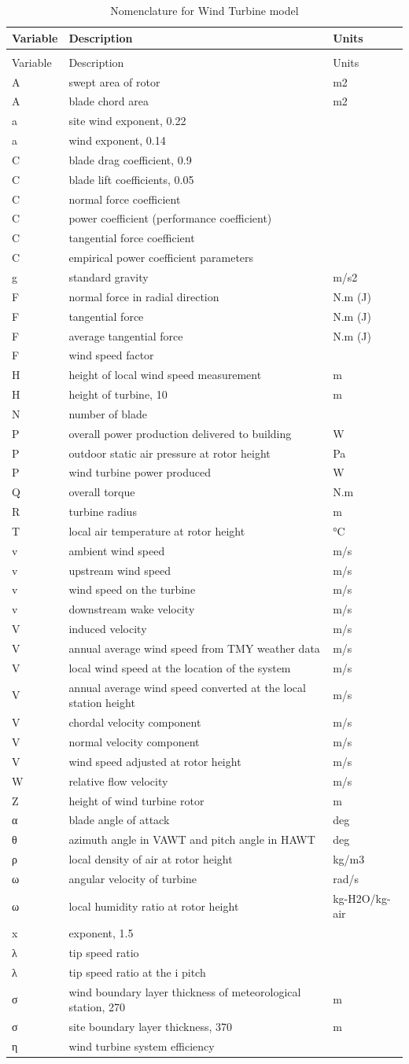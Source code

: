 \begin{longtable}[c]{p{1.5in}p{3.0in}p{1.5in}}
\caption{Nomenclature for Wind Turbine model \label{table:nomenclature-for-wind-turbine-model}} \tabularnewline
\toprule 
Variable & Description & Units \tabularnewline
\midrule
\endfirsthead

\caption[]{Nomenclature for Wind Turbine model} \tabularnewline
\toprule 
Variable & Description & Units \tabularnewline
\midrule
\endhead

A & swept area of rotor & m2 \tabularnewline
A & blade chord area & m2 \tabularnewline
a & site wind exponent, 0.22 & ~ \tabularnewline
a & wind exponent, 0.14 & ~ \tabularnewline
C & blade drag coefficient, 0.9 & ~ \tabularnewline
C & blade lift coefficients, 0.05 & ~ \tabularnewline
C & normal force coefficient & ~ \tabularnewline
C & power coefficient (performance coefficient) & ~ \tabularnewline
C & tangential force coefficient & ~ \tabularnewline
C & empirical power coefficient parameters & ~ \tabularnewline
g & standard gravity & m/s2 \tabularnewline
F & normal force in radial direction & N.m (J) \tabularnewline
F & tangential force & N.m (J) \tabularnewline
F & average tangential force & N.m (J) \tabularnewline
F & wind speed factor & ~ \tabularnewline
H & height of local wind speed measurement & m \tabularnewline
H & height of turbine, 10 & m \tabularnewline
N & number of blade & ~ \tabularnewline
P & overall power production delivered to building~ & W \tabularnewline
P & outdoor static air pressure at rotor height & Pa \tabularnewline
P & wind turbine power produced & W \tabularnewline
Q & overall torque & N.m \tabularnewline
R & turbine radius & m \tabularnewline
T & local air temperature at rotor height & °C \tabularnewline
v & ambient wind speed & m/s \tabularnewline
v & upstream wind speed & m/s \tabularnewline
v & wind speed on the turbine & m/s \tabularnewline
v & downstream wake velocity & m/s \tabularnewline
V & induced velocity & m/s \tabularnewline
V & annual average wind speed from TMY weather data & m/s \tabularnewline
V & local wind speed at the location of the system & m/s \tabularnewline
V & annual average wind speed converted at the local station height & m/s \tabularnewline
V & chordal velocity component & m/s \tabularnewline
V & normal velocity component & m/s \tabularnewline
V & wind speed adjusted at rotor height & m/s \tabularnewline
W & relative flow velocity & m/s \tabularnewline
Z & height of wind turbine rotor & m \tabularnewline
α & blade angle of attack & deg \tabularnewline
θ & azimuth angle in VAWT and pitch angle in HAWT & deg \tabularnewline
ρ & local density of air at rotor height & kg/m3 \tabularnewline
ω & angular velocity of turbine & rad/s \tabularnewline
ω & local humidity ratio at rotor height & kg-H2O/kg-air \tabularnewline
x & exponent, 1.5 & ~ \tabularnewline
λ & tip speed ratio & ~ \tabularnewline
λ & tip speed ratio at the i   pitch & ~ \tabularnewline
σ & wind boundary layer thickness of meteorological station, 270 & m \tabularnewline
σ & site boundary layer thickness, 370 & m \tabularnewline
η & wind turbine system efficiency & ~ \tabularnewline
\bottomrule
\end{longtable}

